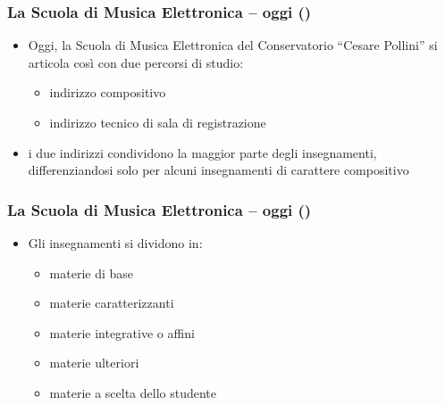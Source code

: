 %
%
%

\setcounter{ms}{0}
\begin{frame}
    \frametitle<+->{La Scuola di Musica Elettronica -- oggi ()}

	\begin{itemize}[<+- | alert@+->]

		\item Oggi, la Scuola di Musica Elettronica del Conservatorio ``Cesare Pollini''
          si articola cos\`i con due percorsi di studio:

      \begin{itemize}[<+- | alert@+->]

        \item indirizzo compositivo

        \item indirizzo tecnico di sala di registrazione

     \end{itemize}

    \item i due indirizzi condividono la maggior parte degli insegnamenti,
          differenziandosi solo per alcuni insegnamenti di carattere
          compositivo

	\end{itemize}

\end{frame}

\begin{frame}
    \frametitle<+->{La Scuola di Musica Elettronica -- oggi ()}

	\begin{itemize}[<+- | alert@+->]

    \item Gli insegnamenti si dividono in:

	  \begin{itemize}[<+- | alert@+->]

      \item materie di base
      
      \item materie caratterizzanti

      \item materie integrative o affini

      \item materie ulteriori

      \item materie a scelta dello studente

	  \end{itemize}

	\end{itemize}

\end{frame}

